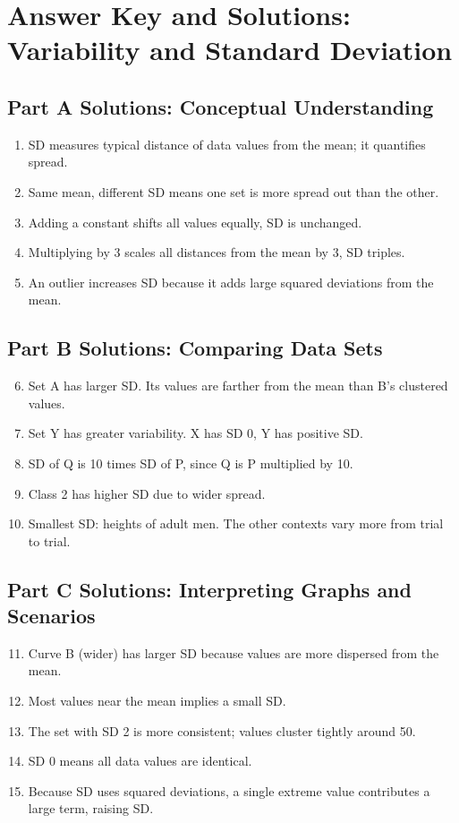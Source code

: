 \documentclass[12pt]{article}
\begin{document}
\section*{Answer Key and Solutions: Variability and Standard Deviation}

\subsection*{Part A Solutions: Conceptual Understanding}
\begin{enumerate}
  \item SD measures typical distance of data values from the mean; it quantifies spread.
  \item Same mean, different SD means one set is more spread out than the other.
  \item Adding a constant shifts all values equally, SD is unchanged.
  \item Multiplying by 3 scales all distances from the mean by 3, SD triples.
  \item An outlier increases SD because it adds large squared deviations from the mean.
\end{enumerate}

\subsection*{Part B Solutions: Comparing Data Sets}
\begin{enumerate}
  \setcounter{enumi}{5}
  \item Set A has larger SD. Its values are farther from the mean than B’s clustered values.
  \item Set Y has greater variability. X has SD 0, Y has positive SD.
  \item SD of Q is 10 times SD of P, since Q is P multiplied by 10.
  \item Class 2 has higher SD due to wider spread.
  \item Smallest SD: heights of adult men. The other contexts vary more from trial to trial.
\end{enumerate}

\subsection*{Part C Solutions: Interpreting Graphs and Scenarios}
\begin{enumerate}
  \setcounter{enumi}{10}
  \item Curve B (wider) has larger SD because values are more dispersed from the mean.
  \item Most values near the mean implies a small SD.
  \item The set with SD 2 is more consistent; values cluster tightly around 50.
  \item SD 0 means all data values are identical.
  \item Because SD uses squared deviations, a single extreme value contributes a large term, raising SD.
\end{enumerate}
\end{document}
